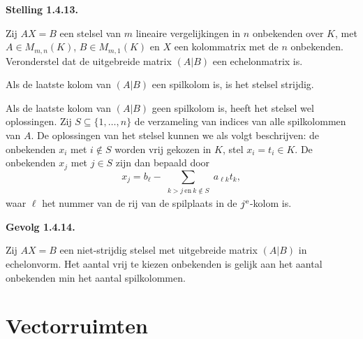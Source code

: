 \documentclass[10pt,a4paper]{article}
\newenvironment{res}[2]{%
  \par\noindent\textbf{#1 #2.}%
}{%
  \par\vspace{2pt}\normalfont
}
\begin{document}
\begin{res}{Stelling}{1.4.13}
Zij $AX=B$ een stelsel van $m$ lineaire vergelijkingen in $n$ onbekenden over $K$, met $A\in M_{m,n}(K)$, $B\in M_{m,1}(K)$ en $X$ een kolommatrix met de $n$ onbekenden. Veronderstel dat de uitgebreide matrix $(A|B)$ een echelonmatrix is.
\begin{myenum}
\item Als de laatste kolom van $(A|B)$ een spilkolom is, is het stelsel strijdig.
\item Als de laatste kolom van $(A|B)$ geen spilkolom is, heeft het stelsel wel oplossingen. Zij $S\subseteq\{1,\dots,n\}$ de verzameling van indices van alle spilkolommen van $A$. De oplossingen van het stelsel kunnen we als volgt beschrijven: de onbekenden $x_i$ met $i\notin S$ worden vrij gekozen in $K$, stel $x_i=t_i\in K$. De onbekenden $x_j$ met $j\in S$ zijn dan bepaald door
\[
x_j=b_\ell-\sum_{\substack{k>j\ \text{en}\ k\notin S}} a_{\ell k}t_k, \tag{$*$}
\]
waar $\ell$ het nummer van de rij van de spilplaats in de $j^{\text e}$-kolom is.
\end{myenum}
\end{res}

\begin{res}{Gevolg}{1.4.14}
Zij $AX=B$ een niet-strijdig stelsel met uitgebreide matrix $(A|B)$ in echelonvorm. Het aantal vrij te kiezen onbekenden is gelijk aan het aantal onbekenden min het aantal spilkolommen.
\end{res}

\section{Vectorruimten}
\end{document}
